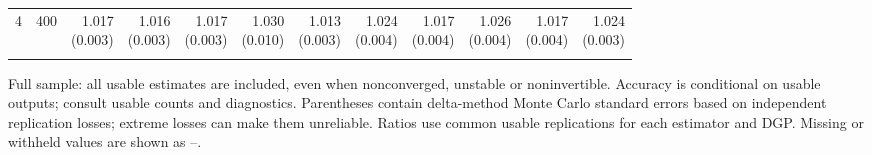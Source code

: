 \begin{table}[p]
{\begin{tabular}{llrrrrrrrrrr}
4 & 400 & \shortstack{1.017\\(0.003)} & \shortstack{1.016\\(0.003)} & \shortstack{1.017\\(0.003)} & \shortstack{1.030\\(0.010)} & \shortstack{1.013\\(0.003)} & \shortstack{1.024\\(0.004)} & \shortstack{1.017\\(0.004)} & \shortstack{1.026\\(0.004)} & \shortstack{1.017\\(0.004)} & \shortstack{1.024\\(0.003)} \\
\addlinespace
\bottomrule\end{tabular}}
\par\medskip
\begin{minipage}{\linewidth}\footnotesize Full sample: all usable estimates are included, even when nonconverged, unstable or noninvertible. Accuracy is conditional on usable outputs; consult usable counts and diagnostics. Parentheses contain delta-method Monte Carlo standard errors based on independent replication losses; extreme losses can make them unreliable. Ratios use common usable replications for each estimator and DGP.  Missing or withheld values are shown as --.\end{minipage}
\end{table}
